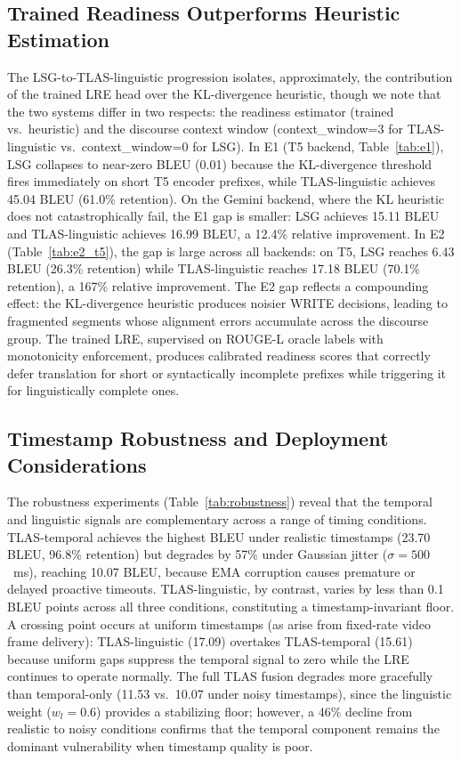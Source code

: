 \documentclass[conference]{IEEEtran}
\begin{document}
\subsection{Trained Readiness Outperforms Heuristic Estimation}

The LSG-to-TLAS-linguistic progression isolates, approximately, the contribution of the trained LRE head over the KL-divergence heuristic, though we note that the two systems differ in two respects: the readiness estimator (trained vs.\ heuristic) and the discourse context window (context\_window=3 for TLAS-linguistic vs.\ context\_window=0 for LSG). In E1 (T5 backend, Table~\ref{tab:e1}), LSG collapses to near-zero BLEU (0.01) because the KL-divergence threshold fires immediately on short T5 encoder prefixes, while TLAS-linguistic achieves 45.04 BLEU (61.0\% retention). On the Gemini backend, where the KL heuristic does not catastrophically fail, the E1 gap is smaller: LSG achieves 15.11 BLEU and TLAS-linguistic achieves 16.99 BLEU, a 12.4\% relative improvement. In E2 (Table~\ref{tab:e2_t5}), the gap is large across all backends: on T5, LSG reaches 6.43 BLEU (26.3\% retention) while TLAS-linguistic reaches 17.18 BLEU (70.1\% retention), a 167\% relative improvement. The E2 gap reflects a compounding effect: the KL-divergence heuristic produces noisier WRITE decisions, leading to fragmented segments whose alignment errors accumulate across the discourse group. The trained LRE, supervised on ROUGE-L oracle labels with monotonicity enforcement, produces calibrated readiness scores that correctly defer translation for short or syntactically incomplete prefixes while triggering it for linguistically complete ones.

\subsection{Timestamp Robustness and Deployment Considerations}

The robustness experiments (Table~\ref{tab:robustness}) reveal that the temporal and linguistic signals are complementary across a range of timing conditions. TLAS-temporal achieves the highest BLEU under realistic timestamps (23.70 BLEU, 96.8\% retention) but degrades by 57\% under Gaussian jitter ($\sigma=500$~ms), reaching 10.07 BLEU, because EMA corruption causes premature or delayed proactive timeouts. TLAS-linguistic, by contrast, varies by less than 0.1 BLEU points across all three conditions, constituting a timestamp-invariant floor. A crossing point occurs at uniform timestamps (as arise from fixed-rate video frame delivery): TLAS-linguistic (17.09) overtakes TLAS-temporal (15.61) because uniform gaps suppress the temporal signal to zero while the LRE continues to operate normally. The full TLAS fusion degrades more gracefully than temporal-only (11.53 vs.\ 10.07 under noisy timestamps), since the linguistic weight ($w_l=0.6$) provides a stabilizing floor; however, a 46\% decline from realistic to noisy conditions confirms that the temporal component remains the dominant vulnerability when timestamp quality is poor.
\end{document}
